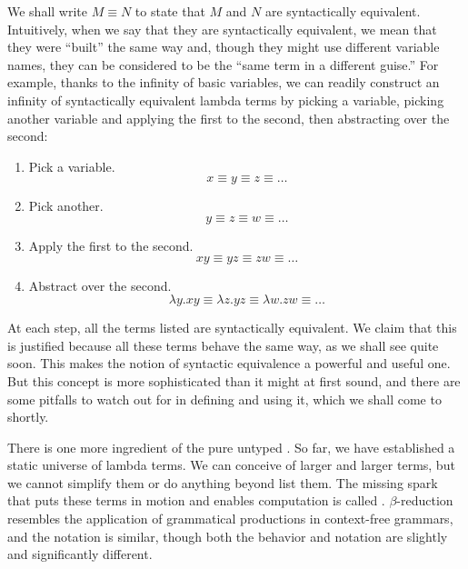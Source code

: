 We shall write $M \equiv N$ to state that $M$ and $N$ are syntactically equivalent. Intuitively, when we say that they are syntactically equivalent, we mean that they were ``built'' the same way and, though they might use different variable names, they can be considered to be the ``same term in a different guise.'' For example, thanks to the infinity of basic variables, we can readily construct an infinity of syntactically equivalent lambda terms by picking a variable, picking another variable and applying the first to the second, then abstracting over the second:
\begin{enumerate}
\item Pick a variable.
\[
x \equiv y \equiv z \equiv \dotso
\]
\item Pick another.
\[
y \equiv z  \equiv w \equiv \dots
\]
\item Apply the first to the second.
\[
x y \equiv y z  \equiv z w \equiv \dots
\]
\item Abstract over the second.
\[
\lambda y . x y \equiv \lambda z . y z \equiv \lambda w . z w \equiv \dotso
\]
\end{enumerate}
At each step, all the terms listed are syntactically equivalent. We claim that this is justified because all these terms behave the same way, as we shall see quite soon. This makes the notion of syntactic equivalence a powerful and useful one. But this concept is more sophisticated than it might at first sound, and there are some pitfalls to watch out for in defining and using it, which we shall come to shortly.

There is one more ingredient of the pure untyped \lambdacalc{}. So far, we have established a static universe of lambda terms. We can conceive of larger and larger terms, but we cannot simplify them or do anything beyond list them. The missing spark that puts these terms in motion and enables computation is called . $\beta$-reduction resembles the application of grammatical productions in context-free grammars, and the notation is similar, though both the behavior and notation are slightly and significantly different.


